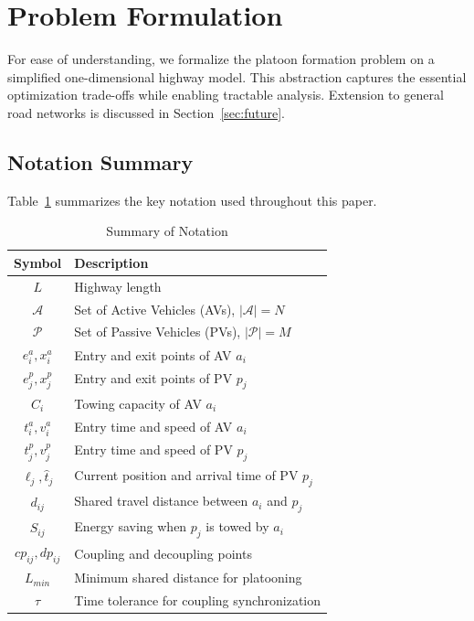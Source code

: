 \documentclass[conference]{IEEEtran}
\begin{document}
\section{Problem Formulation}

For ease of understanding, we formalize the platoon formation problem on a simplified one-dimensional highway model. This abstraction captures the essential optimization trade-offs while enabling tractable analysis. Extension to general road networks is discussed in Section~\ref{sec:future}.

\subsection{Notation Summary}

Table~\ref{tab:notation} summarizes the key notation used throughout this paper.

\begin{table}[htbp]
\caption{Summary of Notation}
\label{tab:notation}
\centering
\begin{tabular}{cl}
\toprule
\textbf{Symbol} & \textbf{Description} \\
\midrule
$L$ & Highway length \\
$\mathcal{A}$ & Set of Active Vehicles (AVs), $|\mathcal{A}| = N$ \\
$\mathcal{P}$ & Set of Passive Vehicles (PVs), $|\mathcal{P}| = M$ \\
$e_i^a, x_i^a$ & Entry and exit points of AV $a_i$ \\
$e_j^p, x_j^p$ & Entry and exit points of PV $p_j$ \\
$C_i$ & Towing capacity of AV $a_i$ \\
$t_i^a, v_i^a$ & Entry time and speed of AV $a_i$ \\
$t_j^p, v_j^p$ & Entry time and speed of PV $p_j$ \\
$\ell_j, \hat{t}_j$ & Current position and arrival time of PV $p_j$ \\
$d_{ij}$ & Shared travel distance between $a_i$ and $p_j$ \\
$S_{ij}$ & Energy saving when $p_j$ is towed by $a_i$ \\
$cp_{ij}, dp_{ij}$ & Coupling and decoupling points \\
$L_{min}$ & Minimum shared distance for platooning \\
$\tau$ & Time tolerance for coupling synchronization \\
\bottomrule
\end{tabular}
\end{table}
\end{document}
